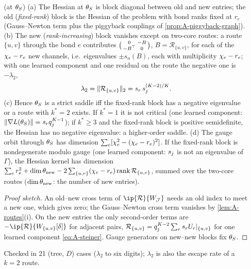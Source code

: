 \begin{proposition}\label{prop:A-hessian}
  \proven{} (at $\theta_S$) 
  (a) The Hessian at $\theta_S$ is block diagonal between old and new entries; the old (\emph{fixed-rank})
  block is the Hessian of the problem with bond ranks fixed at $r_e$ (Gauss--Newton term plus the
  piggyback couplings of \cref{prop:A-piggyback-graph}). (b) The new (\emph{rank-increasing}) block vanishes
  except on two-core routes: a route $\{u,v\}$ through the bond $e$ contributes
  $\big(\begin{smallmatrix}0&-B\\-B^{\top}&0\end{smallmatrix}\big)$, $B=\mathcal R_{\{u,v\}}$, for each of the $\chi_{e}-r_e$ new
  channels, i.e.\ eigenvalues $\pm s_n(B)$, each with multiplicity $\chi_{e}-r_e$; with one learned component and
  one residual on the route the negative one is $-\lambda_2$,
  \begin{equation}\label{eq:A-lambda2}
    \lambda_2=\lVert\mathcal R_{\{u,v\}}\rVert_2=s_{r}\,s_{j}^{(K-2)/K}.
  \end{equation}
  (c) Hence $\theta_S$ is a strict saddle iff the fixed-rank block has a negative eigenvalue or a route with
  $k^*=2$ exists. If $k^*=1$ it is not critical (one learned component: $\lVert\nabla L(\theta_S)\rVert=s_{r}q_j^{K-1}$);
  if $k^*\ge3$ and the fixed-rank block is positive semidefinite, the Hessian has no negative eigenvalue: a
  higher-order saddle. (d) The gauge orbit through $\theta_S$ has dimension $\sum_e[\chi_{e}^2-(\chi_{e}-r_e)^2]$. If
  the fixed-rank block is nondegenerate modulo gauge (one learned component: $s_{j}$ is not an eigenvalue of
  $\Gamma$), the Hessian kernel has dimension
  $\sum_er_e^2+\dim\theta_{\rm new}-2\sum_{\{u,v\}}(\chi_{e}-r_e)\operatorname{rank}\mathcal R_{\{u,v\}}$, summed over the two-core
  routes ($\dim\theta_{\rm new}$: the number of new entries).
\end{proposition}
\begin{proof}[Proof sketch]
  An old--new cross term of $\ip{\mathcal R}{\W_{\mathcal J}}$ needs an old index to meet a new one, which gives
  zero; the Gauss--Newton cross term vanishes by \cref{lem:A-routes}(i). On the new entries the only
  second-order terms are $-\ip{\mathcal R}{\W_{\{u,v\}}[\delta]}$ for adjacent pairs, $\mathcal R_{\{u,v\}}=q_j^{K-2}\sum_rs_{r}U_{r}|_{\{u,v\}}$
  for one learned component \eqref{eq:A-steiner}. Gauge generators on new--new blocks fix $\theta_S$.
\end{proof}
Checked in 21 (tree, $D$) cases ($\lambda_2$ to six digits); $\lambda_2$ is also the escape rate of a $k=2$ route.

